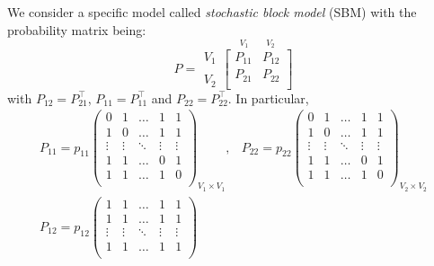 \begin{eg}
	We consider a specific model called \emph{stochastic block model} (SBM) with the probability matrix being:
	\[
		P = \substack{V_1 \\ \\ V_2}\overset{V_1\qquad V_2}{\begin{bmatrix}
				P_{11} & P_{12} \\
				P_{21} & P_{22} \\
			\end{bmatrix}}
	\]
	with \(P_{12} = P_{21}^{\top}\), \(P_{11} = P_{11}^{\top}\) and \(P_{22} = P_{22}^{\top}\). In particular,
	\[
		\begin{split}
			P_{11} = p_{11}\begin{pmatrix}
				               0      & 1      & \dots  & 1      & 1      \\
				               1      & 0      & \dots  & 1      & 1      \\
				               \vdots & \vdots & \ddots & \vdots & \vdots \\
				               1      & 1      & \dots  & 0      & 1      \\
				               1      & 1      & \dots  & 1      & 0      \\
			               \end{pmatrix}_{V_1 \times V_1}, &
			P_{22} = p_{22}\begin{pmatrix}
				               0      & 1      & \dots  & 1      & 1      \\
				               1      & 0      & \dots  & 1      & 1      \\
				               \vdots & \vdots & \ddots & \vdots & \vdots \\
				               1      & 1      & \dots  & 0      & 1      \\
				               1      & 1      & \dots  & 1      & 0      \\
			               \end{pmatrix}_{V_2 \times V_2} \\
			P_{12} = p_{12}\begin{pmatrix}
				               1      & 1      & \dots  & 1      & 1      \\
				               1      & 1      & \dots  & 1      & 1      \\
				               \vdots & \vdots & \ddots & \vdots & \vdots \\
				               1      & 1      & \dots  & 1      & 1      \\

\end{pmatrix}
\end{split}\]
\end{eg}
